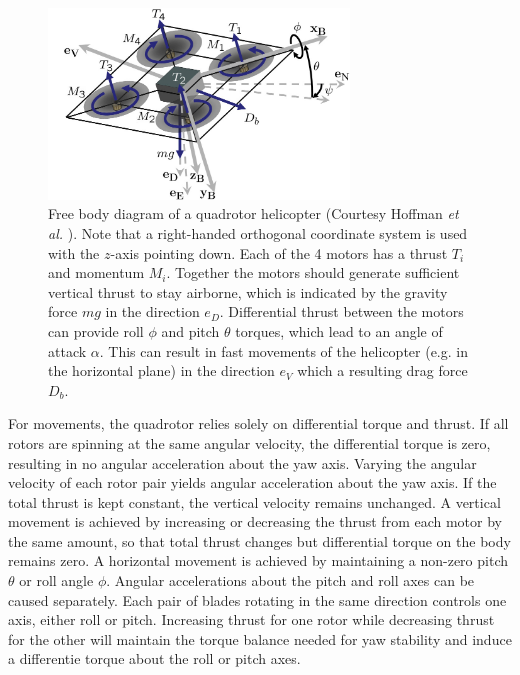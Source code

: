 
\begin{figure}[htb]
\centering
\includegraphics[width=8cm]{images/QuadRotorBody.png}
\caption{Free body diagram of a quadrotor helicopter 
(Courtesy Hoffman \textit{et al.} \cite{Hoffmann2007}). Note that a right-handed orthogonal coordinate system is used with the $z$-axis pointing down. Each of the 4 motors has a thrust $T_i$ and momentum $M_i$. Together the motors should generate sufficient vertical thrust to stay airborne, which is indicated by the gravity force $mg$ in the direction $e_D$. Differential thrust between the motors can provide roll $\phi$ and pitch $\theta$ torques, which lead to an angle of attack $\alpha$. This can result in fast movements of the helicopter (e.g. in the horizontal plane) in the direction $e_V$ which a resulting drag force $D_b$. }
\label{fig:QuadRotorBody}
\end{figure}

For movements, the quadrotor relies solely on differential torque and thrust.
If all rotors are spinning at the same angular velocity, the differential torque is zero, resulting in no angular acceleration about the yaw axis.
Varying the angular velocity of each rotor pair yields angular acceleration about the yaw axis.
If the total thrust is kept constant, the vertical velocity remains unchanged.
A vertical movement is achieved by increasing or decreasing the thrust from each motor by the same amount, so that total thrust changes but differential torque on the body remains zero. 
A horizontal movement is achieved by maintaining a non-zero pitch $\theta$ or roll angle $\phi$.
Angular accelerations about the pitch and roll axes can be caused separately.
Each pair of blades rotating in the same direction controls one axis, either roll or pitch.
Increasing thrust for one rotor while decreasing thrust for the other will maintain the torque balance needed for yaw stability and induce a differentie torque about the roll or pitch axes. 

